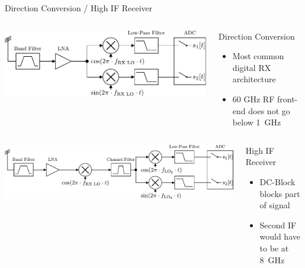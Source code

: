 \documentclass[10pt]{beamer}
\begin{document}
\begin{frame}{Direction Conversion / High IF Receiver}
  \begin{columns}[T]
    \begin{column}{.6\textwidth}
      \vspace{5mm}
      \includegraphics[width=\textwidth]{figures/rx_4_bd}
    \end{column}
    \begin{column}{.4\textwidth}
      \begin{block}{Direction Conversion}
        \begin{itemize}
        \item Most common digital RX architecture
        \item[\frownie] 60 GHz RF front-end does not go below 1~GHz
        \end{itemize}
      \end{block}
    \end{column}
  \end{columns}
  \vspace{4ex}
  \begin{columns}[T]
    \begin{column}{.6\textwidth}
      \vspace{5mm}
      \includegraphics[width=\textwidth]{figures/rx_0_bd}
    \end{column}
    \begin{column}{.4\textwidth}
      \begin{block}{High IF Receiver}
        \begin{itemize}
        \item DC-Block blocks part of signal
        \item[\frownie] Second IF would have to be at 8~GHz
        \end{itemize}
      \end{block}
    \end{column}
  \end{columns}
\end{frame}
\end{document}
